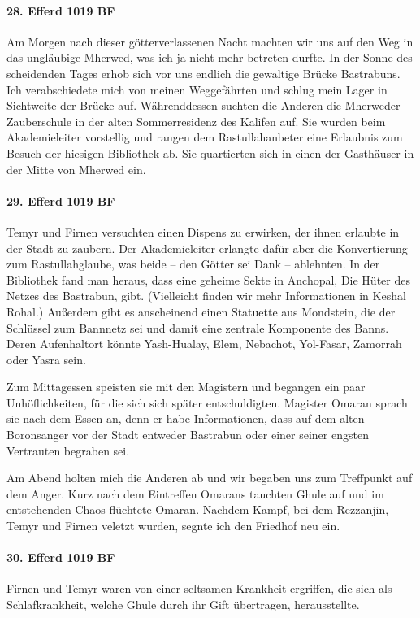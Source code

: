 \paragraph{28. Efferd 1019 BF}
Am Morgen nach dieser götterverlassenen Nacht machten wir uns auf den Weg in das ungläubige Mherwed, was ich ja nicht mehr betreten durfte.
In der Sonne des scheidenden Tages erhob sich vor uns endlich die gewaltige Brücke Bastrabuns. Ich verabschiedete mich von meinen Weggefährten und schlug mein Lager in Sichtweite der Brücke auf. Währenddessen suchten die Anderen die Mherweder Zauberschule in der alten Sommerresidenz des Kalifen auf. Sie wurden beim Akademieleiter vorstellig und rangen dem Rastullahanbeter eine Erlaubnis zum Besuch der hiesigen Bibliothek ab. Sie quartierten sich in einen der Gasthäuser in der Mitte von Mherwed ein.

\paragraph{29. Efferd 1019 BF}
Temyr und Firnen versuchten einen Dispens zu erwirken, der ihnen erlaubte in der Stadt zu zaubern. Der Akademieleiter erlangte dafür aber die Konvertierung zum Rastullahglaube, was beide -- den Götter sei Dank -- ablehnten. In der Bibliothek fand man heraus, dass eine geheime Sekte in Anchopal, Die Hüter des Netzes des Bastrabun, gibt. (Vielleicht finden wir mehr Informationen in Keshal Rohal.) Außerdem gibt es anscheinend einen Statuette aus Mondstein, die der Schlüssel zum Bannnetz sei und damit eine zentrale Komponente des Banns. Deren Aufenhaltort könnte Yash-Hualay, Elem, Nebachot, Yol-Fasar, Zamorrah oder Yasra sein.

Zum Mittagessen speisten sie mit den Magistern und begangen ein paar Unhöflichkeiten, für die sich sich später entschuldigten.
Magister Omaran sprach sie nach dem Essen an, denn er habe Informationen, dass auf dem alten Boronsanger vor der Stadt entweder Bastrabun oder einer seiner engsten Vertrauten begraben sei.

Am Abend holten mich die Anderen ab und wir begaben uns zum Treffpunkt auf dem Anger. Kurz nach dem Eintreffen Omarans tauchten Ghule auf und im entstehenden Chaos flüchtete Omaran. Nachdem Kampf, bei dem Rezzanjin, Temyr und Firnen veletzt wurden, segnte ich den Friedhof neu ein.

\paragraph{30. Efferd 1019 BF}
Firnen und Temyr waren von einer seltsamen Krankheit ergriffen, die sich als Schlafkrankheit, welche Ghule durch ihr Gift übertragen, herausstellte.

